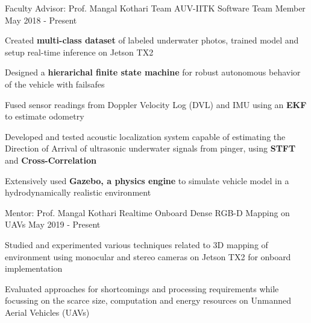 
\begin{cventries}

 \cventry
    {Faculty Advisor: Prof. Mangal Kothari}
    {Team AUV-IITK}
    {Software Team Member}
    {May 2018 - Present}
    {
      \begin{cvitems}
        \item{Created \textbf{multi-class dataset} of labeled underwater photos, trained model and setup real-time inference on Jetson TX2}
        \item{Designed a \textbf{hierarichal finite state machine} for robust autonomous behavior of the vehicle with failsafes}
        \item{Fused sensor readings from Doppler Velocity Log (DVL) and IMU using an \textbf{EKF} to estimate odometry}
        
        \item{Developed and tested acoustic localization system capable of estimating the Direction of Arrival of ultrasonic underwater signals from pinger, using \textbf{STFT} and \textbf{Cross-Correlation}}
        \item{Extensively used \textbf{Gazebo, a physics engine} to simulate vehicle model in a hydrodynamically realistic environment}
      \end{cvitems}
    }
   \cventry
    {Mentor: Prof. Mangal Kothari}
    {Realtime Onboard Dense RGB-D Mapping on UAVs}
    {}
    {May 2019 - Present}
    {
      \begin{cvitems}
        \item {Studied and experimented various techniques related to 3D mapping of environment using monocular and stereo cameras on Jetson TX2 for onboard implementation}
        \item {Evaluated approaches for shortcomings and processing requirements while focussing on the scarce size, computation and energy resources on Unmanned Aerial Vehicles (UAVs)}
      \end{cvitems}
    }


\end{cventries}
